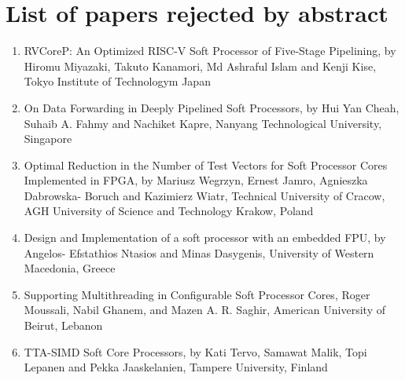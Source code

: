 \section{List of papers rejected by abstract}
\begin{enumerate}
    \item RVCoreP: An Optimized RISC-V Soft Processor of Five-Stage Pipelining, by Hiromu
Miyazaki, Takuto Kanamori, Md Ashraful Islam and Kenji Kise, Tokyo Institute of
Technologym Japan
    \item On Data Forwarding in Deeply Pipelined Soft Processors, by Hui Yan Cheah, Suhaib
A. Fahmy and Nachiket Kapre, Nanyang Technological University, Singapore
    \item Optimal Reduction in the Number of Test Vectors for Soft Processor Cores
Implemented in FPGA, by Mariusz Wegrzyn, Ernest Jamro, Agnieszka Dabrowska-
Boruch and Kazimierz Wiatr, Technical University of Cracow, AGH University of
Science and Technology Krakow, Poland
    \item Design and Implementation of a soft processor with an embedded FPU, by Angelos-
Efstathios Ntasios and Minas Dasygenis, University of Western Macedonia, Greece
    \item Supporting Multithreading in Configurable Soft Processor Cores, Roger Moussali,
Nabil Ghanem, and Mazen A. R. Saghir, American University of Beirut, Lebanon
    \item TTA-SIMD Soft Core Processors, by Kati Tervo, Samawat Malik, Topi Lepanen and
Pekka Jaaskelanien, Tampere University, Finland
\end{enumerate}
